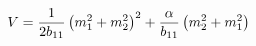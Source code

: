 \begin{equation}
V=\frac{1}{2{b}_{11}}\left( m_{1}^{2}+m_{2}^{2}\right) ^{2}+\frac{\alpha }{%
b_{11}}\left( m_{2}^{2}+m_{1}^{2}\right)
\label{potdacorr}
\end{equation}

